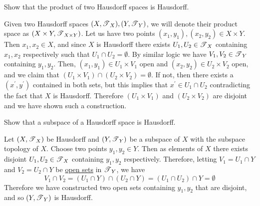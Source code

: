   \begin{exercise}[Munkres 17.11]
    Show that the product of two Hausdorff spaces is Hausdorff.
  \end{exercise}
  \begin{solution}
    Given two Hausdorff spaces $(X, \operatorname{\mathscr{T}}_X), (Y, \operatorname{\mathscr{T}}_Y)$, we will denote their product space as $(X \times Y, \operatorname{\mathscr{T}}_{X \times Y})$. Let us have two points $(x_1, y_1), (x_2, y_2) \in X \times Y$. Then $x_1, x_2 \in X$, and since $X$ is Hausdorff there exists $U_1, U_2 \in \operatorname{\mathscr{T}}_X$ containing $x_1, x_2$ respectively such that $U_1 \cap U_2 = \emptyset$. By similar logic we have $V_1, V_2 \in \operatorname{\mathscr{T}}_Y$ containing $y_1, y_2$. Then, $(x_1, y_1) \in U_1 \times V_1$ open and $(x_2, y_2) \in U_2 \times V_2$ open, and we claim that $(U_1 \times V_1) \cap (U_2 \times V_2) = \emptyset$. If not, then there exists a $(x^\prime, y^\prime)$ contained in both sets, but this implies that $x^\prime \in U_1 \cap U_2$ contradicting the fact that $X$ is Hausdorff. Therefore $(U_1 \times V_1)$ and $(U_2 \times V_2)$ are disjoint and we have shown such a construction. 
  \end{solution}

  \begin{exercise}[Munkres 17.12]
    Show that a subspace of a Hausdorff space is Hausdorff.
  \end{exercise}
  \begin{solution}
    Let $(X, \operatorname{\mathscr{T}}_X)$ be Hausdorff and $(Y, \operatorname{\mathscr{T}}_Y)$ be a subspace of $X$ with the subspace topology of $X$. Choose two points $y_1, y_2 \in Y$. Then as elements of $X$ there exists disjoint $U_1, U_2 \in \operatorname{\mathscr{T}}_X$ containing $y_1, y_2$ respectively. Therefore, letting $V_1 = U_1 \cap Y$ and $V_2 = U_2 \cap Y$ be \hyperref[def:open-set]{open sets} in $\operatorname{\mathscr{T}}_Y$, we have 
    \begin{equation}
      V_1 \cap V_2 = (U_1 \cap Y) \cap (U_2 \cap Y) = (U_1 \cap U_2) \cap Y = \emptyset 
    \end{equation}
    Therefore we have constructed two open sets containing $y_1, y_2$ that are disjoint, and so $(Y, \operatorname{\mathscr{T}}_Y)$ is Hausdorff. 
  \end{solution}

